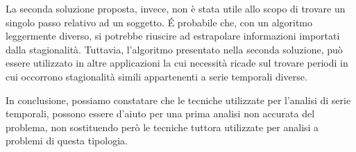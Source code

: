 La seconda soluzione proposta, invece, non è stata utile allo scopo di trovare un singolo passo 
relativo ad un soggetto. 
É probabile che, con un algoritmo leggermente diverso, si potrebbe riuscire ad estrapolare informazioni
importati dalla stagionalità.
Tuttavia, l'algoritmo presentato nella seconda soluzione, può essere utilizzato 
in altre applicazioni la cui necessità ricade sul trovare periodi in cui occorrono stagionalità simili 
appartenenti a serie temporali diverse.

In conclusione, possiamo constatare che le tecniche utilizzate per l'analisi di serie temporali,
possono essere d'aiuto per una prima analisi non accurata del problema,
non sostituendo però le tecniche tuttora utilizzate per analisi a problemi di questa tipologia.